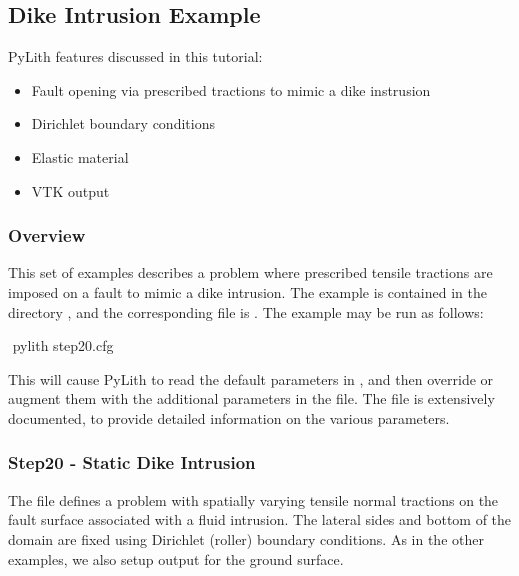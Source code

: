 \subsection{Dike Intrusion Example}
\label{sec:example:3dhex8:dike}

PyLith features discussed in this tutorial:
\begin{itemize}
\item Fault opening via prescribed tractions to mimic a dike instrusion
\item Dirichlet boundary conditions
\item Elastic material
\item VTK output
\end{itemize}

\subsubsection{Overview}

This set of examples describes a problem where prescribed tensile
tractions are imposed on a fault to mimic a dike intrusion. The example
is contained in the directory , and the corresponding
 file is . The example may be run
as follows:
\begin{shell}
$$ pylith step20.cfg
\end{shell}
This will cause PyLith to read the default parameters in ,
and then override or augment them with the additional parameters in
the  file. The  file is extensively
documented, to provide detailed information on the various parameters.


\subsubsection{Step20 - Static Dike Intrusion}

The  file defines a problem with spatially varying
tensile normal tractions on the fault surface associated with a fluid
intrusion. The lateral sides and bottom of the domain are fixed using
Dirichlet (roller) boundary conditions. As in the other examples,
we also setup output for the ground surface.


